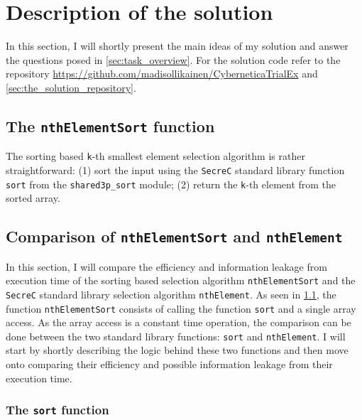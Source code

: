 \documentclass[11pt]{article}
\newcommand{\ct}[1]{\texttt{#1}}
\newcommand{\SC}{\ct{SecreC}\xspace}
\begin{document}

\section{Description of the solution} %
\label{sec:description_of_the_solution}

In this section, I will shortly present the main ideas of my solution and answer the questions posed in \cref{sec:task_overview}. For the solution code refer to the repository \url{https://github.com/madisollikainen/CyberneticaTrialEx} and \cref{sec:the_solution_repository}. 

\subsection{The \ct{nthElementSort} function} %
\label{sub:nthelementsort}

The sorting based \ct{k}-th smallest element selection algorithm is rather straightforward: (1) sort the input using the \SC standard library function \ct{sort} from the \ct{shared3p\_sort} module; (2) return the \ct{k}-th element from the sorted array. 


\subsection{Comparison of \ct{nthElementSort} and \ct{nthElement}} %
\label{sub:comparison_of_nthelementsort_and_nthelement}

In this section, I will compare the efficiency and information leakage from execution time of the sorting based selection algorithm \ct{nthElementSort} and the \SC standard library selection algorithm \ct{nthElement}. As seen in \cref{sub:nthelementsort}, the function \ct{nthElementSort} consists of calling the function \ct{sort} and a single array access. As the array access is a constant time operation, the comparison can be done between the two standard library functions: \ct{sort} and \ct{nthElement}. I will start by shortly describing the logic behind these two functions and then move onto comparing their efficiency and possible information leakage from their execution time.

\subsubsection{The \ct{sort} function} %
\label{ssub:the_sort_function}
 
\end{document}
